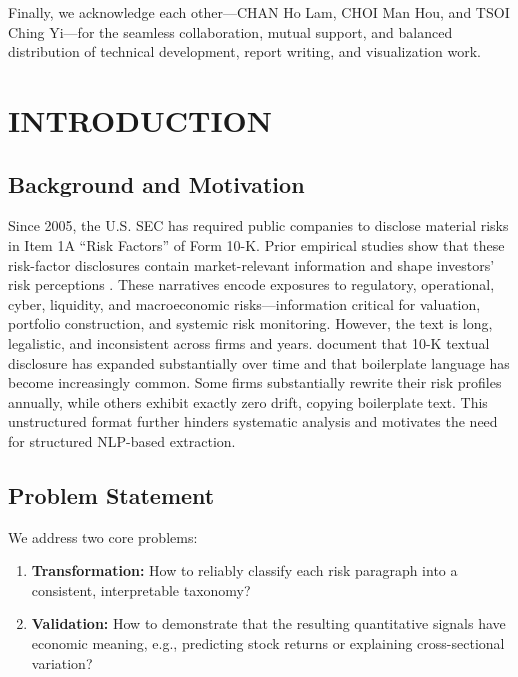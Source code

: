 \documentclass[11pt, a4paper]{article}
\begin{document}
Finally, we acknowledge each other---CHAN Ho Lam, CHOI Man Hou, and TSOI Ching Yi---for the seamless collaboration, mutual support, and balanced distribution of technical development, report writing, and visualization work.

\tableofcontents
\listoffigures
\listoftables
\newpage

\section{INTRODUCTION}

\subsection{Background and Motivation}
Since 2005, the U.S. SEC has required public companies to disclose material risks in Item 1A ``Risk Factors'' of Form 10-K. Prior empirical studies show that these risk-factor disclosures contain market-relevant information and shape investors' risk perceptions \citep{kravet2013textual, campbell2014information, hope2016benefits}. These narratives encode exposures to regulatory, operational, cyber, liquidity, and macroeconomic risks---information critical for valuation, portfolio construction, and systemic risk monitoring. However, the text is long, legalistic, and inconsistent across firms and years. \citet{dyer2017evolution} document that 10-K textual disclosure has expanded substantially over time and that boilerplate language has become increasingly common. Some firms substantially rewrite their risk profiles annually, while others exhibit exactly zero drift, copying boilerplate text. This unstructured format further hinders systematic analysis and motivates the need for structured NLP-based extraction.

\subsection{Problem Statement}
We address two core problems:
\begin{enumerate}
    \item \textbf{Transformation:} How to reliably classify each risk paragraph into a consistent, interpretable taxonomy?
    \item \textbf{Validation:} How to demonstrate that the resulting quantitative signals have economic meaning, e.g., predicting stock returns or explaining cross-sectional variation?
\end{enumerate}
\end{document}
